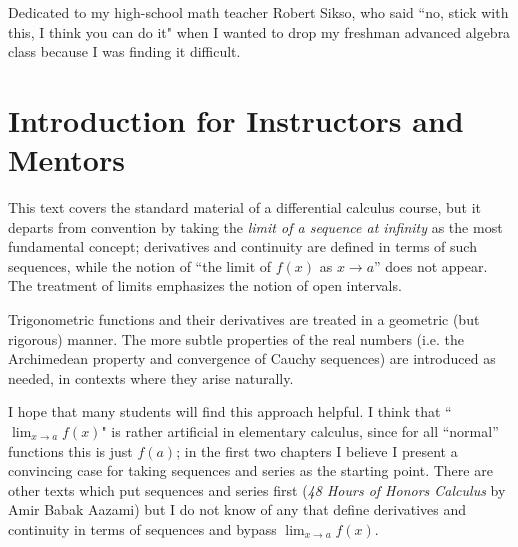 \documentclass[12pt, oneside]{article}   	%
\begin{document}
\maketitle
Dedicated to my high-school math teacher Robert Sikso, who said ``no, stick with this, I think you can do it" when I wanted to drop my freshman advanced algebra class because I was finding it difficult.


\section*{Introduction for Instructors and Mentors}
This text covers the standard material of a differential calculus course, but it departs from convention by taking the \emph{limit of a sequence at infinity} as the most fundamental concept; derivatives and continuity are defined in terms of such sequences, while the notion of ``the limit of $f(x)$ as $x \to a$'' does not appear. The treatment of limits emphasizes the notion of open intervals.

Trigonometric functions and their derivatives are treated in a  geometric (but rigorous) manner.
The more subtle properties of the real numbers (i.e. the Archimedean property and convergence of Cauchy sequences) are introduced as needed, in contexts where they arise naturally. %

 I hope that many students will find this approach helpful.  I think that ``$\lim_{x \to a}f(x)$" is rather artificial in elementary calculus, since for all ``normal'' functions  this is just $f(a)$; in the first two chapters I believe I present a convincing case for taking sequences and series as the starting point. %
There are other texts which put sequences and series first (\emph{48 Hours of Honors Calculus} by Amir Babak Aazami) but I do not know of any that define derivatives and continuity in terms of sequences and bypass $\lim_{x \to a}f(x)$.
\end{document}
